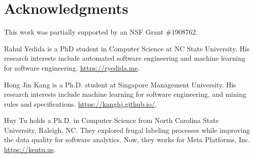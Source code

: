 \documentclass[compsoc,10pt]{IEEEtran}
\begin{document}
\section*{Acknowledgments}
This work was partially supported by an NSF Grant \#1908762.
 
 
{\footnotesize 
\balance

} 


\begin{IEEEbiography} {Rahul Yedida} is a PhD student in Computer Science at NC State University. His research interests include automated software engineering and machine learning for software engineering.   \url{https://ryedida.me}.
\end{IEEEbiography}
\vspace{-20mm}
\begin{IEEEbiography}{Hong Jin Kang  } is a Ph.D. student at Singapore Management University. His research interests include machine learning for software engineering, and mining rules and specifications.
 \url{https://kanghj.github.io/}.
\end{IEEEbiography}
\vspace{-20mm}
\begin{IEEEbiography}{Huy Tu} holds a Ph.D. in Computer Science from North
Carolina State University, Raleigh, NC. They explored frugal labeling 
processes while improving the data quality for software analytics. Now, they works for Meta Platforms, Inc.  \newline \url{https://kentu.us}.
\end{IEEEbiography}
\end{document}
